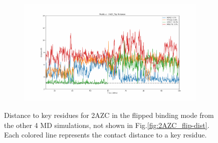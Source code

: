 \begin{figure}[!ht]
\begin{subfigure}{.45\textwidth}
  \end{subfigure}
    \begin{subfigure}{.45\textwidth}
     \centering
     \includegraphics[width=.95\linewidth]{chapter4/2AZC_flip/2AZC_flip-dist_4.pdf}
  \end{subfigure}
\caption{Distance to key residues for 2AZC in the flipped binding mode from the other 4 MD simulations, not shown in Fig.\ref{fig:2AZC_flip-dist}. Each colored line represents the contact distance to a key residue.}
\label{sup:2AZC_flip-dist}
\end{figure}  

